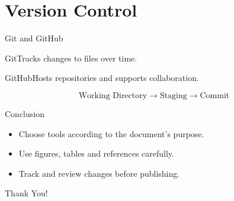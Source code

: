 \documentclass[aspectratio=169]{beamer}
\begin{document}
\section{Version Control}
\begin{frame}{Git and GitHub}
\begin{block}{Git}Tracks changes to files over time.\end{block}
\begin{block}{GitHub}Hosts repositories and supports collaboration.\end{block}
\[\text{Working Directory} \rightarrow \text{Staging} \rightarrow \text{Commit}\]
\end{frame}
\begin{frame}{Conclusion}
\begin{itemize}
\item Choose tools according to the document's purpose.
\item Use figures, tables and references carefully.
\item Track and review changes before publishing.
\end{itemize}
\centering \Large Thank You!
\end{frame}
\end{document}
